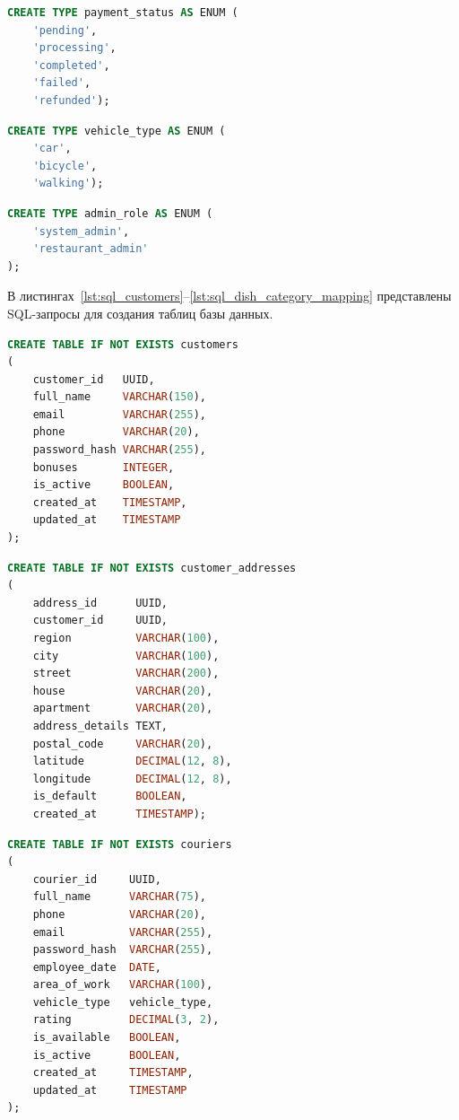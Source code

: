 \begin{lstlisting}[caption={Создание типа \code{payment\_status}}, label={lst:sql_payment_status}, language=SQL]
CREATE TYPE payment_status AS ENUM (
    'pending',
    'processing',
    'completed',
    'failed',
    'refunded');
\end{lstlisting}
\begin{lstlisting}[caption={Создание типа \code{vehicle\_type}}, label={lst:sql_vehicle_type}, language=SQL]
CREATE TYPE vehicle_type AS ENUM (
    'car',
    'bicycle',
    'walking');
\end{lstlisting}

\begin{lstlisting}[caption={Создание типа \code{admin\_role}}, label={lst:sql_admin_role}, language=SQL]
CREATE TYPE admin_role AS ENUM (
    'system_admin',
    'restaurant_admin'
);
\end{lstlisting}

В листингах~\ref{lst:sql_customers}--\ref{lst:sql_dish_category_mapping} представлены SQL-запросы для создания таблиц базы данных.

\begin{lstlisting}[caption={Создание таблицы \code{customers}}, label={lst:sql_customers}, language=SQL]
CREATE TABLE IF NOT EXISTS customers
(
    customer_id   UUID,
    full_name     VARCHAR(150),
    email         VARCHAR(255),
    phone         VARCHAR(20),
    password_hash VARCHAR(255),
    bonuses       INTEGER,
    is_active     BOOLEAN,
    created_at    TIMESTAMP,
    updated_at    TIMESTAMP
);
\end{lstlisting}

\begin{lstlisting}[caption={Создание таблицы \code{customer\_addresses}}, label={lst:sql_customer_addresses}, language=SQL]
CREATE TABLE IF NOT EXISTS customer_addresses
(
    address_id      UUID,
    customer_id     UUID,
    region          VARCHAR(100),
    city            VARCHAR(100),
    street          VARCHAR(200),
    house           VARCHAR(20),
    apartment       VARCHAR(20),
    address_details TEXT,
    postal_code     VARCHAR(20),
    latitude        DECIMAL(12, 8),
    longitude       DECIMAL(12, 8),
    is_default      BOOLEAN,
    created_at      TIMESTAMP);
\end{lstlisting}

\begin{lstlisting}[caption={Создание таблицы \code{couriers}}, label={lst:sql_couriers}, language=SQL]
CREATE TABLE IF NOT EXISTS couriers
(
    courier_id     UUID,
    full_name      VARCHAR(75),
    phone          VARCHAR(20),
    email          VARCHAR(255),
    password_hash  VARCHAR(255),
    employee_date  DATE,
    area_of_work   VARCHAR(100),
    vehicle_type   vehicle_type,
    rating         DECIMAL(3, 2),
    is_available   BOOLEAN,
    is_active      BOOLEAN,
    created_at     TIMESTAMP,
    updated_at     TIMESTAMP
);
\end{lstlisting}

